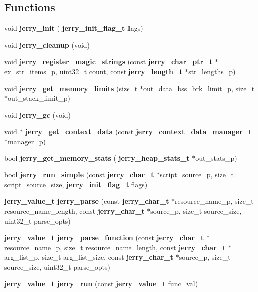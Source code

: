 \subsection*{Functions}
\begin{DoxyCompactItemize}
\item 
void \textbf{ jerry\+\_\+init} (\textbf{ jerry\+\_\+init\+\_\+flag\+\_\+t} flags)
\item 
void {\bfseries jerry\+\_\+cleanup} (void)
\item 
void {\bfseries jerry\+\_\+register\+\_\+magic\+\_\+strings} (const \textbf{ jerry\+\_\+char\+\_\+ptr\+\_\+t} $\ast$ex\+\_\+str\+\_\+items\+\_\+p, uint32\+\_\+t count, const \textbf{ jerry\+\_\+length\+\_\+t} $\ast$str\+\_\+lengths\+\_\+p)
\item 
void {\bfseries jerry\+\_\+get\+\_\+memory\+\_\+limits} (size\+\_\+t $\ast$out\+\_\+data\+\_\+bss\+\_\+brk\+\_\+limit\+\_\+p, size\+\_\+t $\ast$out\+\_\+stack\+\_\+limit\+\_\+p)
\item 
void {\bfseries jerry\+\_\+gc} (void)
\item 
void $\ast$ {\bfseries jerry\+\_\+get\+\_\+context\+\_\+data} (const \textbf{ jerry\+\_\+context\+\_\+data\+\_\+manager\+\_\+t} $\ast$manager\+\_\+p)
\item 
bool {\bfseries jerry\+\_\+get\+\_\+memory\+\_\+stats} (\textbf{ jerry\+\_\+heap\+\_\+stats\+\_\+t} $\ast$out\+\_\+stats\+\_\+p)
\item 
bool \textbf{ jerry\+\_\+run\+\_\+simple} (const \textbf{ jerry\+\_\+char\+\_\+t} $\ast$script\+\_\+source\+\_\+p, size\+\_\+t script\+\_\+source\+\_\+size, \textbf{ jerry\+\_\+init\+\_\+flag\+\_\+t} flags)
\item 
\textbf{ jerry\+\_\+value\+\_\+t} {\bfseries jerry\+\_\+parse} (const \textbf{ jerry\+\_\+char\+\_\+t} $\ast$resource\+\_\+name\+\_\+p, size\+\_\+t resource\+\_\+name\+\_\+length, const \textbf{ jerry\+\_\+char\+\_\+t} $\ast$source\+\_\+p, size\+\_\+t source\+\_\+size, uint32\+\_\+t parse\+\_\+opts)
\item 
\textbf{ jerry\+\_\+value\+\_\+t} {\bfseries jerry\+\_\+parse\+\_\+function} (const \textbf{ jerry\+\_\+char\+\_\+t} $\ast$resource\+\_\+name\+\_\+p, size\+\_\+t resource\+\_\+name\+\_\+length, const \textbf{ jerry\+\_\+char\+\_\+t} $\ast$arg\+\_\+list\+\_\+p, size\+\_\+t arg\+\_\+list\+\_\+size, const \textbf{ jerry\+\_\+char\+\_\+t} $\ast$source\+\_\+p, size\+\_\+t source\+\_\+size, uint32\+\_\+t parse\+\_\+opts)
\item 
\textbf{ jerry\+\_\+value\+\_\+t} {\bfseries jerry\+\_\+run} (const \textbf{ jerry\+\_\+value\+\_\+t} func\+\_\+val)

\end{DoxyCompactItemize}
